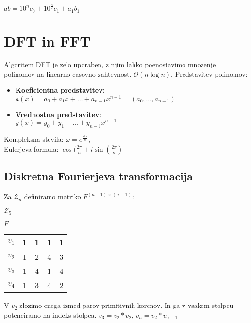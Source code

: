 \documentclass{article}
\begin{document}
\begin{multicols}{2}
\begin{center}
    \begin{math}
        ab = 10^n c_0 + 10^{\frac{n}{2}} c_1 + a_1 b_1
    \end{math}
\end{center}
\section{DFT in FFT}
Algoritem DFT je zelo uporaben, z njim lahko poenostavimo mnozenje polinomov na linearno casovno zahtevnost. $\mathcal{O}(n \log n)$.
Predstavitev polinomov:

\begin{itemize}
    \item \textbf{Koeficientna predstavitev:}\\ $a(x) = a_0 +  a_1 x + \dots + a_{n-1} x^{n-1} = (a_0, \dots, a_{n-1})$
    \item \textbf{Vrednostna predstavitev:}\\ $y(x) = y_0 +  y_1 + \dots + y_{n-1} x^{n-1}$
\end{itemize}
Kompleksna stevila:
$\omega = e^{\frac{i 2 \pi}{n}}$,\\
Eulerjeva formula:
$\cos(\frac{2\pi}{n} + i \sin(\frac{2\pi}{n})$


\subsection{Diskretna Fourierjeva transformacija}
Za $\mathcal{Z}_n$ definiramo matriko $F^{(n-1) \times (n-1)}$:

$\mathcal{Z}_5$
\begin{center}
    $F =$
    \begin{tabular}{ |c|c|c|c|c| } 
        \hline
        $v_1$ &     1 & 1 & 1 & 1 \\ 
        \hline
        $v_2$ &     1 & 2 & 4 & 3 \\  
        \hline
        $v_3$ &     1 & 4 & 1 & 4 \\
        \hline
        $v_4$ &     1 & 3 & 4 & 2 \\
        \hline
    \end{tabular}
\end{center}
V $v_2$ zlozimo enega izmed parov primitivnih korenov. In ga v vsakem stolpcu potenciramo na indeks stolpca.
$v_3 = v_2 * v_2$, $v_n = v_2 * v_{n-1}$


\end{multicols}
\end{document}
